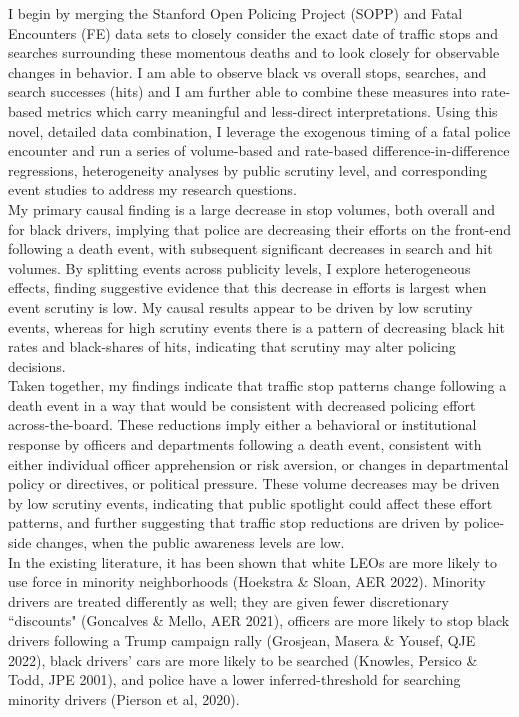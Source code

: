 \documentclass[12pt,a4paper]{article}
\begin{document}
I begin by merging the Stanford Open Policing Project (SOPP) and Fatal Encounters (FE) data sets to closely consider the exact date of traffic stops and searches surrounding these momentous deaths and to look closely for observable changes in behavior. I am able to observe black vs overall stops, searches, and search successes (hits) and I am further able to combine these measures into rate-based metrics which carry meaningful and less-direct interpretations. Using this novel, detailed data combination, I leverage the exogenous timing of a fatal police encounter and run a series of volume-based and rate-based difference-in-difference regressions, heterogeneity analyses by public scrutiny level, and corresponding event studies to address my research questions. \\

My primary causal finding is a large decrease in stop volumes, both overall and for black drivers, implying that police are decreasing their efforts on the front-end following a death event, with subsequent significant decreases in search and hit volumes. By splitting events across publicity levels, I explore heterogeneous effects, finding suggestive evidence that this decrease in efforts is largest when event scrutiny is low. My causal results appear to be driven by low scrutiny events, whereas for high scrutiny events there is a pattern of decreasing black hit rates and black-shares of hits, indicating that scrutiny may alter policing decisions. \\

Taken together, my findings indicate that traffic stop patterns change following a death event in a way that would be consistent with decreased policing effort across-the-board. These reductions imply either a behavioral or institutional response by officers and departments following a death event, consistent with either individual officer apprehension or risk aversion, or changes in departmental policy or directives, or political pressure. These volume decreases may be driven by low scrutiny events, indicating that public spotlight could affect these effort patterns, and further suggesting that traffic stop reductions are driven by police-side changes, when the public awareness levels are low. \\

In the existing literature, it has been shown that white LEOs are more likely to use force in minority neighborhoods (Hoekstra \& Sloan, AER 2022). Minority drivers are treated differently as well; they are given fewer discretionary ``discounts" (Goncalves \& Mello, AER 2021), officers are more likely to stop black drivers following a Trump campaign rally (Grosjean, Masera \& Yousef, QJE 2022), black drivers' cars are more likely to be searched (Knowles, Persico \& Todd, JPE 2001), and police have a lower inferred-threshold for searching minority drivers (Pierson et al, 2020). \\
\end{document}
